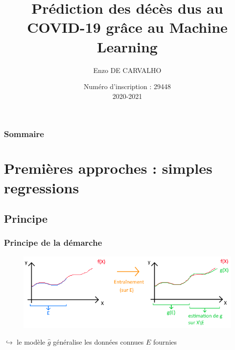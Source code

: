 \documentclass{beamer}[aspectratio = 43]
\title{Prédiction des décès dus au COVID-19 grâce au Machine Learning}
\subtitle{}
\author{Enzo DE CARVALHO}
\date{
	Numéro d'inscription : 29448\\%
	\vspace{5pt}
	2020-2021\\%
	}
\begin{document}
\begin{frame}
	\maketitle
\end{frame}

\begin{frame}
	\frametitle{Sommaire}
	\tableofcontents
\end{frame}

\section{Premières approches : simples regressions}
\subsection*{Principe}
\begin{frame}
	\frametitle{Principe de la démarche}
	\begin{figure}[t]
		\centering
		\includegraphics[scale=0.7]{super_schema}
	\end{figure}
	$\hookrightarrow$ le modèle $\hat{g}$ généralise les données connues $E$ fournies
\end{frame}
\end{document}
